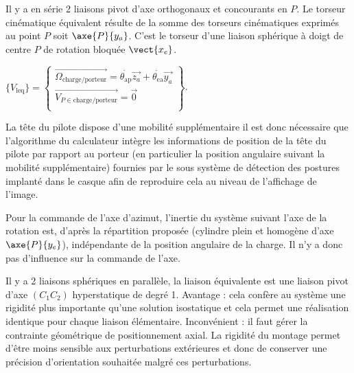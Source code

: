 \question{}
\ifprof
\begin{corrige}
Il y a en série 2 liaisons pivot d'axe orthogonaux et concourants en $P$. Le torseur cinématique équivalent résulte de la somme des torseurs cinématiques exprimés au point $P$ soit $\axe{P}{y_a}$. C'est le torseur d'une 
liaison sphérique à doigt de centre $P$ de rotation bloquée $\vect{x_e}$.


\(\{ V_{\text{leq}}\} = \begin{Bmatrix}
\overrightarrow{\Omega_{\text{charge}/\text{porteur}}} = \dot{\theta_{\text{ap}}}\overrightarrow{z_{a}} + \dot{\theta_{\text{ea}}}\overrightarrow{y_{a}} \\
\overrightarrow{V_{P \in \text{charge}/\text{porteur}}} = \overrightarrow{0} \\
\end{Bmatrix}\).

\end{corrige}
\else
\fi


\question{}
\ifprof
\begin{corrige}
La tête du pilote dispose d'une mobilité supplémentaire il est donc nécessaire que l'algorithme du calculateur intègre les informations de position de la tête du pilote par rapport au porteur (en particulier la position angulaire suivant la mobilité supplémentaire) fournies par le sous système de détection des postures implanté dans le casque afin de reproduire cela au niveau de l'affichage de l'image.
\end{corrige}
\else
\fi


\question{}
\ifprof
\begin{corrige}
Pour la commande de l'axe d'azimut, l'inertie du système suivant l'axe de la rotation est, d'après la répartition proposée (cylindre plein et homogène d'axe $\axe{P}{y_e}$), indépendante de la position angulaire de la charge. Il n'y a donc pas d'influence sur la commande de l'axe.
\end{corrige}
\else
\fi


\question{}
\ifprof
\begin{corrige}
Il y a 2 liaisons sphériques en parallèle, la liaison équivalente est une liaison pivot d'axe $(C_1 C_2)$  hyperstatique de degré 1. Avantage : cela confère au système une rigidité plus importante qu'une solution isostatique et cela permet une réalisation identique pour chaque liaison élémentaire. Inconvénient : il faut gérer la contrainte géométrique de positionnement axial. La rigidité du montage permet d'être moins sensible aux perturbations extérieures et donc de conserver une précision d'orientation souhaitée malgré ces perturbations.
\end{corrige}
\else
\fi



